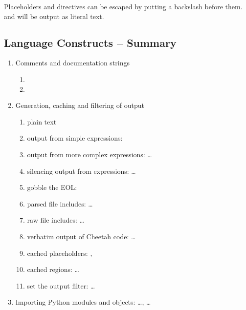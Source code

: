Placeholders and directives can be escaped by putting a backslash before them.
 and  will be output as literal text.

\subsection{Language Constructs -- Summary}
\label{language.constructs}

\begin{enumerate}
\item Comments and documentation strings
     \begin{enumerate}
     \item {}
     \item {}
     \end{enumerate}

\item Generation, caching and filtering of output
     \begin{enumerate}
     \item plain text
     \item output from simple expressions: 
     \item output from more complex expressions:  \ldots
     \item silencing output from expressions:  \ldots
     \item gobble the EOL: 
     \item parsed file includes:  \ldots
     \item raw file includes:  \ldots
     \item verbatim output of Cheetah code:  \ldots {}
     \item cached placeholders: , 
     \item cached regions:  \ldots {}
     \item set the output filter:  \ldots
     \end{enumerate}
          
\item Importing Python modules and objects:  \ldots,
      \ldots


\end{enumerate}
